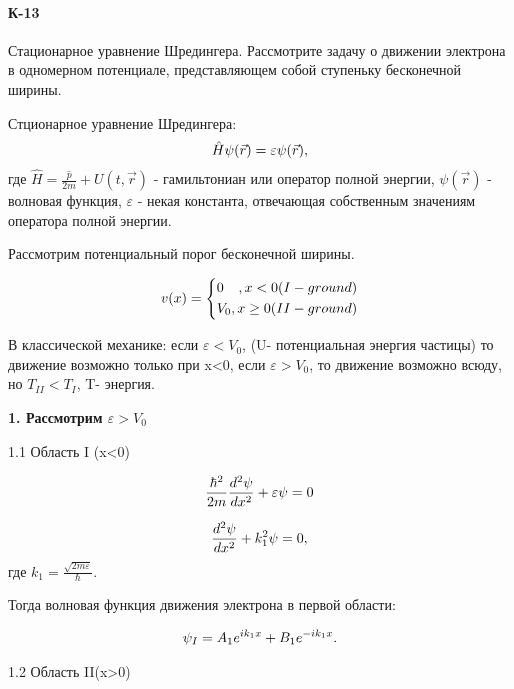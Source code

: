 \documentclass[__main__.tex]{subfiles}
\begin{document}
\paragraph{К-13}
Стационарное уравнение Шредингера. Рассмотрите задачу о движении электрона в одномерном потенциале, представляющем собой ступеньку бесконечной ширины.

\begin{definition}
	Стционарное уравнение Шредингера: 
	\begin{gather}
	\llabel{shred}
	\hat{H}\psi(\vec{r})=\varepsilon\psi(\vec{r}), 
	\end{gather}
	где $\hat{H}=\frac{\hat{p}}{2m}+U(t,\vec{r})$ - гамильтониан или оператор полной энергии, $\psi(\vec{r})$ - волновая функция, $\varepsilon$ - некая константа,  отвечающая собственным значениям оператора полной энергии.
\end{definition}

Рассмотрим потенциальный порог бесконечной ширины.


$$
v(x)=
\left\{
\begin{gathered}
0\hfill ,x<0 (I - ground)\\
V_{0}\hfill, x\ge 0 (II - ground)\\
\end{gathered}
\right.
$$

В классической механике: если $\varepsilon<V_{0}$, (U- потенциальная энергия частицы) то движение возможно только при x<0, если $\varepsilon>V_{0}$, то движение возможно всюду, но $T_{II}<T_{I}$, T- энергия.

\textbf{1. Рассмотрим  $\varepsilon>V_{0}$ }

1.1 Область I (x<0)

\begin{gather}
\llabel{movi1}
\frac{\hbar^{2}}{2m}\frac{d^{2}\psi}{dx^{2}}+\varepsilon\psi=0
\end{gather}

\begin{gather}
\llabel{movi2}
\frac{d^{2}\psi}{dx^{2}}+k_{1}^{2}\psi=0,
\end{gather}
где $k_{1}=\frac{\sqrt{2m\varepsilon}}{\hbar}$.

Тогда волновая функция движения электрона в первой области:

\begin{gather}
\llabel{movi3}
\psi_{I}=A_{1}e^{ik_{1}x}+B_{1}e^{-ik_{1}x}.
\end{gather}

1.2 Область II(x>0)
\end{document}
